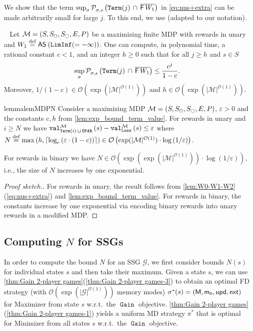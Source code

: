 \documentclass[a4paper,UKenglish,cleveref,autoref,thm-restate]{lipics-v2021}
\DeclareMathOperator{\Term}{\mathtt{Term}}
\DeclareMathOperator{\Gain}{\mathtt{Gain}}
\DeclareMathOperator{\Loss}{\mathtt{Loss}}
\newcommand{\Oparity}{\mathtt{OPAR}}
\newcommand{\LimInf}[2]{\mathtt{LimInf}(#1 #2)}
\DeclarePairedDelimiter{\ceil}{\lceil}{\rceil}
\newcommand{\+}[1]{\mathbb{#1}}
\newcommand{\?}[1]{\mathcal{#1}}
\newcommand{\Ocompl}{\?{O}}
\newcommand{\rsymbol}{\ocircle}
\newcommand{\zsymbol}{\Box}
\newcommand{\zstates}{\states_\zsymbol}
\newcommand{\rstates}{\states_\rsymbol}
\newcommand{\abs}[1]{\lvert#1\rvert}
\newcommand{\size}[1]{\abs{#1}}
\newcommand{\eqby}[2][=]{\stackrel{\text{{\tiny{#2}}}}{#1}}
\newcommand{\eqdef}{\eqby{def}}
\newcommand{\eps}{\varepsilon}
\newcommand{\Prob}[2][]{\mathcal{P}^{#1}_{#2}}
\newcommand{\eventually}{{\sf F}}
\newcommand{\lrc}[1]{\left(#1\right)}
\newcommand{\tuple}[1]{\lrc{#1}}
\newcommand{\game}{{\mathcal G}}
\newcommand{\mdp}{{\mathcal M}}
\newcommand{\mdptuple}{\tuple{\states,\zstates,\rstates,\transition,\probp}}
\newcommand{\states}{S}
\newcommand{\s}{s}
\newcommand{\transition}{{E}}
\newcommand{\probp}{P}
\newcommand{\complementof}[1]{\overline{#1}}
\newcommand{\zstrat}{\sigma}
\newcommand{\ostrat}{\pi}
\newcommand{\optzstrat}{\zstrat^*}
\newcommand{\optostrat}{\ostrat^*}
\newcommand{\memory}{{\sf M}}
\newcommand{\updatefun}{upd}
\newcommand{\memconf}{{\sf m}}
\newcommand{\memsuc}{{\sf nxt}}
\newcommand{\memup}{{\sf \updatefun}}
\newcommand{\memstrattuple}{\tuple{\memory,\initmem,\memup,\memsuc}}
\newcommand{\initmem}{\memconf_0}
\newcommand{\AS}[2][]{\mathsf{AS}^{#1}\left(#2\right)}
\begin{document}
We show that the term
$\sup_{\zstrat}\Prob[]{\zstrat,\s} \left(\Term(j)\, \cap \, \complementof{\eventually\, {W_1}}\right)$
in \cref{eq:nus+extra} can be made arbitrarily small for large $j$.
To this end, we use \cite[Lemma~3.9]{BBEK:IC2013} (adapted to our notation).

\begin{lemma}~\cite[Lemma~3.9 and Claim~6]{BBEK:IC2013} \label{lem:exp_bound_term_value}
Let $\mdp = \mdptuple$ be a maximizing finite MDP with rewards in unary and
$W_1 \eqdef \AS{\LimInf{=}{-\infty}}$.
One can compute, in polynomial time, a rational constant $c < 1$,
and an integer $h \ge 0$
such that for all $j \ge h$
and $\s \in \states$
	\[
		\sup_{\zstrat}\Prob{\zstrat,\s}\lrc{\Term(j) \, \cap\,
                  \complementof{\eventually\,W_1}} \le
                \frac{c^j}{1-c}.
	\]
Moreover, $1/(1-c) \in {\Ocompl}\left(\exp(\size{\mdp}^{\Ocompl(1)})\right)$ and
$h \in {\Ocompl}(\exp\lrc{\size{\mdp}^{{\Ocompl}(1)}})$.
\end{lemma}

\bigskip
\begin{restatable}{lemma}{lemMDPN}\label{lem:MDP-N}
Consider a maximizing MDP $\mdp = \mdptuple$, $\eps >0$ and the constants $c,h$ from \cref{lem:exp_bound_term_value}.
For rewards in unary and $i \ge N$ we have
$\valueof[\mdp][\Term(i)\,\cup\, \Oparity]{\s} - \valueof[\mdp][\Loss]{\s} \le
\eps$ where
$N \eqdef \max\lrc{h,\ceil{\log_c\lrc{\eps \cdot \lrc{1-c}}}} \in {\Ocompl}\left(\exp(\size{\mdp}^{\Ocompl(1)})\cdot \log\lrc{1/\eps}\right)$.

For rewards in binary we have
$N \in {\Ocompl}\left(\exp(\exp(\size{\mdp}^{\Ocompl(1)}))\cdot
  \log\lrc{1/\eps}\right)$, i.e.,
the size of $N$ increases by one exponential.
\end{restatable}
\begin{proof}[Proof sketch.] %
  For rewards in unary, the result follows from
  \cref{lem:W0-W1-W2}(\cref{eq:nus+extra}) and \cref{lem:exp_bound_term_value}.
  For rewards in binary, the constants increase by one exponential via
  encoding binary rewards into unary rewards in a modified MDP.
\end{proof}






\subsection{Computing \texorpdfstring{$N$}{N} for SSGs}\label{subsec:N-for-SSG}
In order to compute the bound $N$ for an SSG $\game$,
we first consider bounds $N(\s)$ for individual states $\s$
and then take their maximum.
Given a state $\s$,
we can use \cref{thm:Gain 2-player games}(\cref{thm:Gain 2-player games-3})
to obtain an optimal FD strategy (with $\Ocompl(\exp(|\game|^{\Ocompl(1)}))$ memory modes)
$\optzstrat(\s) = \memstrattuple$ for Maximizer from state $\s$ w.r.t.\ the
$\Gain$ objective.
\cref{thm:Gain 2-player games}(\cref{thm:Gain 2-player games-1})
yields a uniform MD strategy $\optostrat$
that is optimal for Minimizer from all states $\s$ w.r.t.\ the
$\Gain$ objective.
\end{document}
